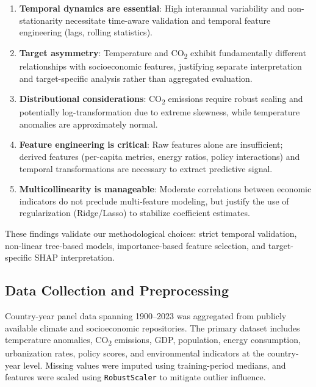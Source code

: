 \documentclass[conference]{IEEEtran}
\begin{document}
\begin{enumerate}
    \item \textbf{Temporal dynamics are essential}: High interannual variability and 
    non-stationarity necessitate time-aware validation and temporal feature engineering 
    (lags, rolling statistics).
    
    \item \textbf{Target asymmetry}: Temperature and CO\textsubscript{2} exhibit 
    fundamentally different relationships with socioeconomic features, justifying 
    separate interpretation and target-specific analysis rather than aggregated 
    evaluation.
    
    \item \textbf{Distributional considerations}: CO\textsubscript{2} emissions require 
    robust scaling and potentially log-transformation due to extreme skewness, while 
    temperature anomalies are approximately normal.
    
    \item \textbf{Feature engineering is critical}: Raw features alone are insufficient; 
    derived features (per-capita metrics, energy ratios, policy interactions) and 
    temporal transformations are necessary to extract predictive signal.
    
    \item \textbf{Multicollinearity is manageable}: Moderate correlations between 
    economic indicators do not preclude multi-feature modeling, but justify the use 
    of regularization (Ridge/Lasso) to stabilize coefficient estimates.
\end{enumerate}

These findings validate our methodological choices: strict temporal validation, 
non-linear tree-based models, importance-based feature selection, and target-specific 
SHAP interpretation.
\subsection{Data Collection and Preprocessing}

Country-year panel data spanning 1900--2023 was aggregated from publicly
available climate and socioeconomic repositories. The primary dataset
\cite{ankit2025dataset} includes temperature anomalies, CO\textsubscript{2}
emissions, GDP, population, energy consumption, urbanization rates, policy
scores, and environmental indicators at the country-year level. Missing values
were imputed using training-period medians, and features were scaled using
\texttt{RobustScaler} to mitigate outlier influence.
\end{document}
